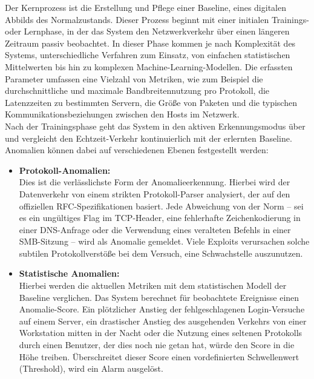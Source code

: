 Der Kernprozess ist die Erstellung und Pflege einer Baseline, eines digitalen Abbilds des Normalzustands. Dieser Prozess beginnt mit einer initialen Trainings- oder Lernphase, in der das System den Netzwerkverkehr über einen längeren Zeitraum passiv beobachtet. In dieser Phase kommen je nach Komplexität des Systems, unterschiedliche Verfahren zum Einsatz, von einfachen statistischen Mittelwerten bis hin zu komplexen Machine-Learning-Modellen. Die erfassten Parameter umfassen eine Vielzahl von Metriken, wie zum Beispiel die durchschnittliche und maximale Bandbreitennutzung pro Protokoll, die Latenzzeiten zu bestimmten Servern, die Größe von Paketen und die typischen Kommunikationsbeziehungen zwischen den Hosts im Netzwerk.\\

Nach der Trainingsphase geht das System in den aktiven Erkennungsmodus über und vergleicht den Echtzeit-Verkehr kontinuierlich mit der erlernten Baseline. Anomalien können dabei auf verschiedenen Ebenen festgestellt werden:\\
\begin{itemize}
	\item \textbf{Protokoll-Anomalien:} \\Dies ist die verlässlichste Form der Anomalieerkennung. Hierbei wird der Datenverkehr von einem strikten Protokoll-Parser analysiert, der auf den offiziellen RFC-Spezifikationen basiert. Jede Abweichung von der Norm – sei es ein ungültiges Flag im TCP-Header, eine fehlerhafte Zeichenkodierung in einer DNS-Anfrage oder die Verwendung eines veralteten Befehls in einer SMB-Sitzung – wird als Anomalie gemeldet. Viele Exploits verursachen solche subtilen Protokollverstöße bei dem Versuch, eine Schwachstelle auszunutzen.\\

\item\textbf{ Statistische Anomalien:} \\Hierbei werden die aktuellen Metriken mit dem statistischen Modell der Baseline verglichen. Das System berechnet für beobachtete Ereignisse einen Anomalie-Score. Ein plötzlicher Anstieg der fehlgeschlagenen Login-Versuche auf einem Server, ein drastischer Anstieg des ausgehenden Verkehrs von einer Workstation mitten in der Nacht oder die Nutzung eines seltenen Protokolls durch einen Benutzer, der dies noch nie getan hat, würde den Score in die Höhe treiben. Überschreitet dieser Score einen vordefinierten Schwellenwert (Threshold), wird ein Alarm ausgelöst.
\end{itemize}
